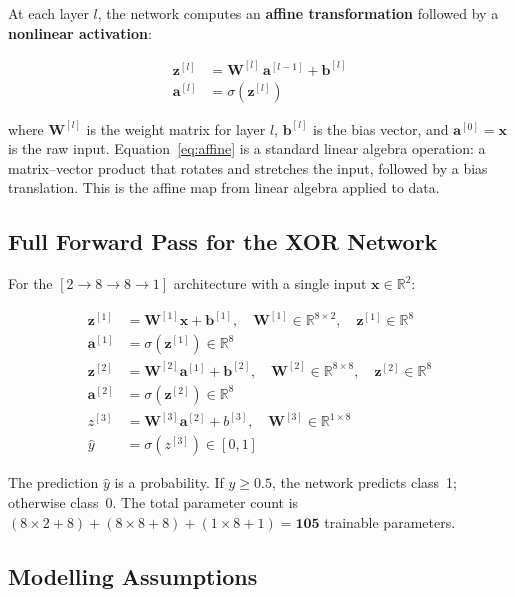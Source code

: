 \documentclass[12pt,a4paper]{article}
\begin{document}
At each layer $l$, the network computes an \textbf{affine transformation} followed by a \textbf{nonlinear activation}:

\begin{align}
  \mathbf{z}^{[l]} &= \mathbf{W}^{[l]}\,\mathbf{a}^{[l-1]} + \mathbf{b}^{[l]}
  \label{eq:affine}\\
  \mathbf{a}^{[l]} &= \sigma\!\left(\mathbf{z}^{[l]}\right)
  \label{eq:act}
\end{align}

where $\mathbf{W}^{[l]}$ is the weight matrix for layer $l$, $\mathbf{b}^{[l]}$ is the bias vector, and $\mathbf{a}^{[0]} = \mathbf{x}$ is the raw input. Equation~\eqref{eq:affine} is a standard linear algebra operation: a matrix--vector product that rotates and stretches the input, followed by a bias translation. This is the affine map from linear algebra applied to data.

\subsection{Full Forward Pass for the XOR Network}

For the $[2 \to 8 \to 8 \to 1]$ architecture with a single input $\mathbf{x} \in \mathbb{R}^2$:

\begin{align}
  \mathbf{z}^{[1]} &= \mathbf{W}^{[1]}\mathbf{x} + \mathbf{b}^{[1]},
  \quad \mathbf{W}^{[1]}\in\mathbb{R}^{8\times2},\quad \mathbf{z}^{[1]}\in\mathbb{R}^8 \\
  \mathbf{a}^{[1]} &= \sigma(\mathbf{z}^{[1]}) \in\mathbb{R}^8 \\
  \mathbf{z}^{[2]} &= \mathbf{W}^{[2]}\mathbf{a}^{[1]} + \mathbf{b}^{[2]},
  \quad \mathbf{W}^{[2]}\in\mathbb{R}^{8\times8},\quad \mathbf{z}^{[2]}\in\mathbb{R}^8 \\
  \mathbf{a}^{[2]} &= \sigma(\mathbf{z}^{[2]}) \in\mathbb{R}^8 \\
  z^{[3]}           &= \mathbf{W}^{[3]}\mathbf{a}^{[2]} + b^{[3]},
  \quad \mathbf{W}^{[3]}\in\mathbb{R}^{1\times8} \\
  \hat{y}           &= \sigma(z^{[3]}) \in [0,1]
\end{align}

The prediction $\hat{y}$ is a probability. If $\hat{y} \geq 0.5$, the network predicts class~1; otherwise class~0. The total parameter count is $(8{\times}2 + 8) + (8{\times}8 + 8) + (1{\times}8 + 1) = \mathbf{105}$ trainable parameters.

\subsection{Modelling Assumptions}
\end{document}
